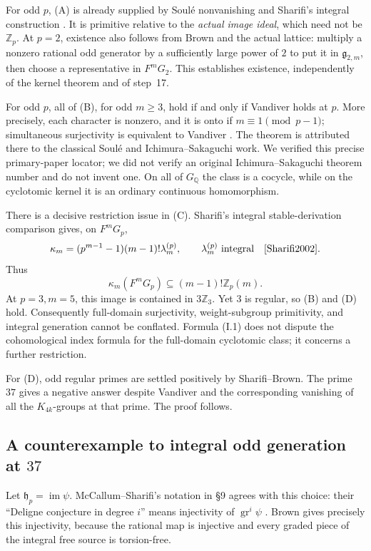 \documentclass[11pt,a4paper]{article}
\theoremstyle{definition}
\begin{document}
For odd $p$, (A) is already supplied by Soul\'e nonvanishing and Sharifi's integral construction \cite[Proposition~2.3, pp.~5--6]{Sharifi2002}. It is primitive relative to the \emph{actual image ideal}, which need not be $\mathbb Z_p$. At $p=2$, existence also follows from Brown and the actual lattice: multiply a nonzero rational odd generator by a sufficiently large power of $2$ to put it in $\mathfrak g_{2,m}$, then choose a representative in $F^mG_2$. This establishes existence, independently of the kernel theorem and of step~17.

For odd $p$, all of (B), for odd $m\geq3$, hold if and only if Vandiver holds at $p$. More precisely, each character is nonzero, and it is onto if $m\equiv1\pmod{p-1}$; simultaneous surjectivity is equivalent to Vandiver \cite[Theorem~1.1(1)--(3), p.~2]{IshiiKummer2024}. The theorem is attributed there to the classical Soul\'e and Ichimura--Sakaguchi work. We verified this precise primary-paper locator; we did not verify an original Ichimura--Sakaguchi theorem number and do not invent one. On all of $G_{\mathbb Q}$ the class is a cocycle, while on the cyclotomic kernel it is an ordinary continuous homomorphism.

There is a decisive restriction issue in (C). Sharifi's integral stable-derivation comparison gives, on $F^mG_p$,
\[
 \kappa_m=(p^{m-1}-1)(m-1)!\lambda_m^{(p)},
 \qquad \lambda_m^{(p)}\text{ integral}
 \quad\cite[(2.10), p.~7]{Sharifi2002}.
\]
Thus
\[
 \kappa_m(F^mG_p)\subseteq(m-1)!\mathbb Z_p(m).              \tag{I.1}
\]
At $p=3,m=5$, this image is contained in $3\mathbb Z_3$. Yet $3$ is regular, so (B) and (D) hold. Consequently full-domain surjectivity, weight-subgroup primitivity, and integral generation cannot be conflated. Formula (I.1) does not dispute the cohomological index formula for the full-domain cyclotomic class; it concerns a further restriction.

For (D), odd regular primes are settled positively by Sharifi--Brown. The prime $37$ gives a negative answer despite Vandiver and the corresponding vanishing of all the $K_{4k}$-groups at that prime. The proof follows.

\subsection{A counterexample to integral odd generation at \texorpdfstring{$37$}{37}}
\label{sec:integral37}

Let $\mathfrak h_p=\operatorname{im}\psi$. McCallum--Sharifi's notation in \S9 agrees with this choice: their ``Deligne conjecture in degree $i$'' means injectivity of $\operatorname{gr}^i\psi$ \cite[p.~24]{McCallumSharifi2003}. Brown gives precisely this injectivity, because the rational map is injective and every graded piece of the integral free source is torsion-free.
\end{document}
